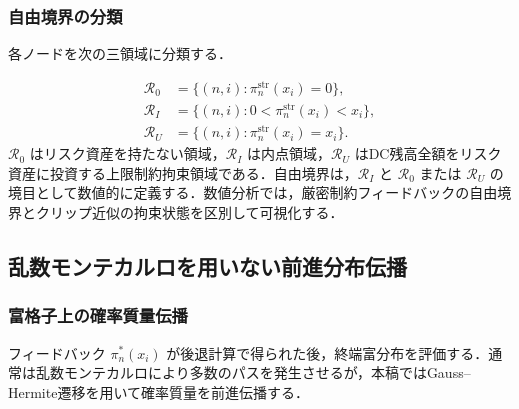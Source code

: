 \documentclass[10pt,a4paper]{article}
\theoremstyle{plain}
\theoremstyle{definition}
\begin{document}
\subsubsection{自由境界の分類}

各ノードを次の三領域に分類する．

\begin{align}
  \mathcal R_0&=\{(n,i):\pi_n^{\mathrm{str}}(x_i)=0\},\label{eq:R0}\\
  \mathcal R_I&=\{(n,i):0<\pi_n^{\mathrm{str}}(x_i)<x_i\},\label{eq:RI}\\
  \mathcal R_U&=\{(n,i):\pi_n^{\mathrm{str}}(x_i)=x_i\}.\label{eq:RU}
\end{align}
$\mathcal R_0$ はリスク資産を持たない領域，$\mathcal R_I$ は内点領域，$\mathcal R_U$ はDC残高全額をリスク資産に投資する上限制約拘束領域である．自由境界は，$\mathcal R_I$ と $\mathcal R_0$ または $\mathcal R_U$ の境目として数値的に定義する．数値分析では，厳密制約フィードバックの自由境界とクリップ近似の拘束状態を区別して可視化する．

\subsection{乱数モンテカルロを用いない前進分布伝播}
\label{sec:forward}

\subsubsection{富格子上の確率質量伝播}

フィードバック $\pi_n^*(x_i)$ が後退計算で得られた後，終端富分布を評価する．通常は乱数モンテカルロにより多数のパスを発生させるが，本稿ではGauss--Hermite遷移を用いて確率質量を前進伝播する．
\end{document}
